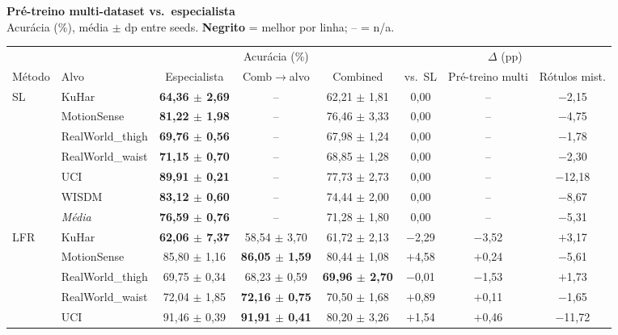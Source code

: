 \documentclass[border=8pt,varwidth=\maxdimen]{standalone}
\begin{document}
\centering
{\large\bfseries Pré-treino multi-dataset vs.\ especialista}\\[2pt]
{\scriptsize Acurácia (\%), média $\pm$ dp entre seeds. \textbf{Negrito} = melhor por linha; -- = n/a.}\\[6pt]
\begin{tabular}{llcccccc}
\toprule
& & \multicolumn{3}{c}{Acurácia (\%)} & \multicolumn{3}{c}{$\Delta$ (pp)}\\
\cmidrule(lr){3-5}\cmidrule(lr){6-8}
Método & Alvo & Especialista & Comb$\to$alvo & Combined & vs.\ SL & Pré-treino multi & Rótulos mist.\\
\midrule
\multirow{7}{*}{SL}
 & KuHar           & \textbf{64{,}36 $\pm$ 2{,}69} & -- & 62{,}21 $\pm$ 1{,}81 & 0{,}00 & -- & $-$2{,}15\\
 & MotionSense     & \textbf{81{,}22 $\pm$ 1{,}98} & -- & 76{,}46 $\pm$ 3{,}33 & 0{,}00 & -- & $-$4{,}75\\
 & RealWorld\_thigh& \textbf{69{,}76 $\pm$ 0{,}56} & -- & 67{,}98 $\pm$ 1{,}24 & 0{,}00 & -- & $-$1{,}78\\
 & RealWorld\_waist& \textbf{71{,}15 $\pm$ 0{,}70} & -- & 68{,}85 $\pm$ 1{,}28 & 0{,}00 & -- & $-$2{,}30\\
 & UCI             & \textbf{89{,}91 $\pm$ 0{,}21} & -- & 77{,}73 $\pm$ 2{,}73 & 0{,}00 & -- & $-$12{,}18\\
 & WISDM           & \textbf{83{,}12 $\pm$ 0{,}60} & -- & 74{,}44 $\pm$ 2{,}00 & 0{,}00 & -- & $-$8{,}67\\
\cmidrule(lr){2-8}
 & \textit{Média}    & \textbf{76{,}59 $\pm$ 0{,}76} & -- & 71{,}28 $\pm$ 1{,}80 & 0{,}00 & -- & $-$5{,}31\\
\midrule
\multirow{7}{*}{LFR}
 & KuHar           & \textbf{62{,}06 $\pm$ 7{,}37} & 58{,}54 $\pm$ 3{,}70 & 61{,}72 $\pm$ 2{,}13 & $-$2{,}29 & $-$3{,}52 & $+$3{,}17\\
 & MotionSense     & 85{,}80 $\pm$ 1{,}16 & \textbf{86{,}05 $\pm$ 1{,}59} & 80{,}44 $\pm$ 1{,}08 & $+$4{,}58 & $+$0{,}24 & $-$5{,}61\\
 & RealWorld\_thigh& 69{,}75 $\pm$ 0{,}34 & 68{,}23 $\pm$ 0{,}59 & \textbf{69{,}96 $\pm$ 2{,}70} & $-$0{,}01 & $-$1{,}53 & $+$1{,}73\\
 & RealWorld\_waist& 72{,}04 $\pm$ 1{,}85 & \textbf{72{,}16 $\pm$ 0{,}75} & 70{,}50 $\pm$ 1{,}68 & $+$0{,}89 & $+$0{,}11 & $-$1{,}65\\
 & UCI             & 91{,}46 $\pm$ 0{,}39 & \textbf{91{,}91 $\pm$ 0{,}41} & 80{,}20 $\pm$ 3{,}26 & $+$1{,}54 & $+$0{,}46 & $-$11{,}72\\

\end{tabular}
\end{document}
